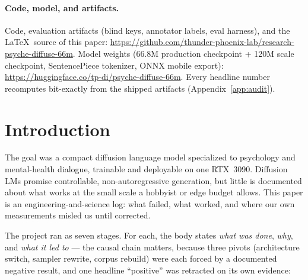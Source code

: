 \documentclass[11pt]{article}
\begin{document}
\paragraph{Code, model, and artifacts.} Code, evaluation artifacts (blind keys, annotator labels, eval harness), and the \LaTeX\ source of this paper: \url{https://github.com/thunder-phoenix-lab/research-psyche-diffuse-66m}. Model weights (66.8M production checkpoint + 120M scale checkpoint, SentencePiece tokenizer, ONNX mobile export): \url{https://huggingface.co/tp-di/psyche-diffuse-66m}. Every headline number recomputes bit-exactly from the shipped artifacts (Appendix~\ref{app:audit}).

\section{Introduction}

The goal was a compact diffusion language model specialized to psychology and mental-health dialogue, trainable and deployable on one RTX~3090. Diffusion LMs promise controllable, non-autoregressive generation, but little is documented about what works at the small scale a hobbyist or edge budget allows. This paper is an engineering-and-science log: what failed, what worked, and where our own measurements misled us until corrected.

The project ran as seven stages. For each, the body states \emph{what was done}, \emph{why}, and \emph{what it led to} --- the causal chain matters, because three pivots (architecture switch, sampler rewrite, corpus rebuild) were each forced by a documented negative result, and one headline ``positive'' was retracted on its own evidence:
\end{document}
